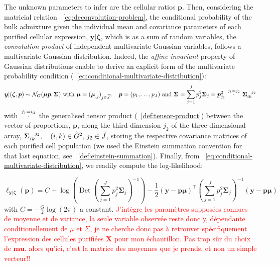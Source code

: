 \documentclass[long, final]{jobim}
\newcommand{\cdotT}[1]{\stackrel{\mathclap{
#1}}{\quad \cdot \quad}}
\DeclareMathOperator*{\DET}{Det}
\begin{document}
The unknown parameters to infer are the cellular ratios $\boldsymbol{p}$. Then, considering the matricial relation \equationname ~\ref{eq:deconvolution-problem}, the conditional probability of the bulk admixture given the individual mean and covariance parameters of each purified cellular expression, $\boldsymbol{y}|\boldsymbol{\zeta}$, which is as a sum of random variables, the \textit{convolution product} of independent multivariate Gaussian variables, follows a multivariate Gaussian distribution. Indeed, the \textit{affine invariant} property of Gaussian distributions enable to derive an explicit form of the multivariate probability condition (\equationname~\ref{eq:conditional-multivariate-distribution}):
\begin{equation}
\label{eq:conditional-multivariate-distribution}
\boldsymbol{y}|(\boldsymbol{\zeta}, \boldsymbol{p}) \sim \mathcal{N}_G(\boldsymbol{\mu} \boldsymbol{p}, \boldsymbol{\Sigma}) \text{ with } \boldsymbol{\mu} = (\boldsymbol{\mu}_{.j})_{j \in \widetilde{J}}, \quad \boldsymbol {p}=(p_1, \ldots, p_J) \text{ and } \boldsymbol{\Sigma}=\sum_{j=1}^J p_{j}^2\boldsymbol{\Sigma}_{j}=
\boldsymbol{p}_{j_1}^2 \cdotT{j_1=j_2} \boldsymbol{\Sigma}\indices{_{ik}^{j_2}}
\end{equation}
with $\cdotT{j_1=i_3}$ the generalised tensor product (~\ref{def:tensor-product}) between the vector of proportions, $\boldsymbol{p}$, along the third dimension $j_2$ of the three-dimensional array, $\boldsymbol{\Sigma}\indices{_{ik}^{j_2}}, \quad (i, k)\in \widetilde{G}^2, \, j_2 \in \widetilde{J}$, storing the respective covariance matrices of each purified cell population (we used the Einstein summation convention for that last equation, see ~\ref{def:einstein-summation}).
Finally, from \equationname~\ref{eq:conditional-multivariate-distribution}, we readily compute the log-likelihood:

\begin{equation}
\label{eq:loglikelihood-multivariate-gaussian}
\ell_{\boldsymbol{y} | \boldsymbol{\zeta}}(\boldsymbol{p})=C + \log\left(\DET \left(\sum_{j=1}^J p_{j}^2\boldsymbol{\Sigma}_{j}\right)^{-1}\right) - \frac{1}{2} (\boldsymbol{y} - \boldsymbol{p} \boldsymbol{\mu})^\top \left(\sum_{j=1}^J p_{j}^2\boldsymbol{\Sigma}_{j}\right)^{-1} (\boldsymbol{y} - \boldsymbol{p}\boldsymbol{\mu})
\end{equation} with $C=-\frac{G}{2}\log(2\pi)$ a constant.
\textcolor{red}{J'intègre les paramètres supposées connues de moyenne et de variance, la seule variable observée reste donc y, dépendante conditionellement de $\mu$ et $\Sigma$, je ne cherche donc pas à retrouver spécifiquement l'expression des cellules purifiées $\boldsymbol{X}$ pour mon échantillon. Pas trop sûr du choix de $\boldsymbol{mu}$, alors qu'ici, c'est la matrice des moyennes que je prends, et non un simple vecteur!!}
\end{document}
